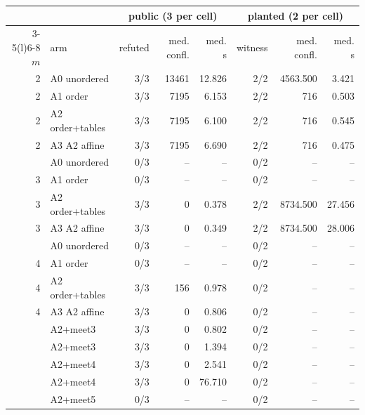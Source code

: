 \begin{tabular}{@{}rlrrrrrr@{}}
\toprule
 & & \multicolumn{3}{c}{public (3 per cell)} & \multicolumn{3}{c}{planted (2 per cell)} \\
\cmidrule(lr){3-5}\cmidrule(l){6-8}
$m$ & arm & refuted & med. confl. & med. s & witness & med. confl. & med. s \\
\midrule
2 & A0 unordered & 3/3 & 13461 & 12.826 & 2/2 & 4563.500 & 3.421 \\
2 & A1 order & 3/3 & 7195 & 6.153 & 2/2 & 716 & 0.503 \\
2 & A2 order+tables & 3/3 & 7195 & 6.100 & 2/2 & 716 & 0.545 \\
2 & A3 A2 affine & 3/3 & 7195 & 6.690 & 2/2 & 716 & 0.475 \\
\addlinespace
3 & A0 unordered & 0/3 & -- & -- & 0/2 & -- & -- \\
3 & A1 order & 0/3 & -- & -- & 0/2 & -- & -- \\
3 & A2 order+tables & 3/3 & 0 & 0.378 & 2/2 & 8734.500 & 27.456 \\
3 & A3 A2 affine & 3/3 & 0 & 0.349 & 2/2 & 8734.500 & 28.006 \\
\addlinespace
4 & A0 unordered & 0/3 & -- & -- & 0/2 & -- & -- \\
4 & A1 order & 0/3 & -- & -- & 0/2 & -- & -- \\
4 & A2 order+tables & 3/3 & 156 & 0.978 & 0/2 & -- & -- \\
4 & A3 A2 affine & 3/3 & 0 & 0.806 & 0/2 & -- & -- \\
\addlinespace
5 & A2+meet3 & 3/3 & 0 & 0.802 & 0/2 & -- & -- \\
\addlinespace
6 & A2+meet3 & 3/3 & 0 & 1.394 & 0/2 & -- & -- \\
\addlinespace
7 & A2+meet4 & 3/3 & 0 & 2.541 & 0/2 & -- & -- \\
\addlinespace
8 & A2+meet4 & 3/3 & 0 & 76.710 & 0/2 & -- & -- \\
\addlinespace
9 & A2+meet5 & 0/3 & -- & -- & 0/2 & -- & -- \\
\bottomrule
\end{tabular}
